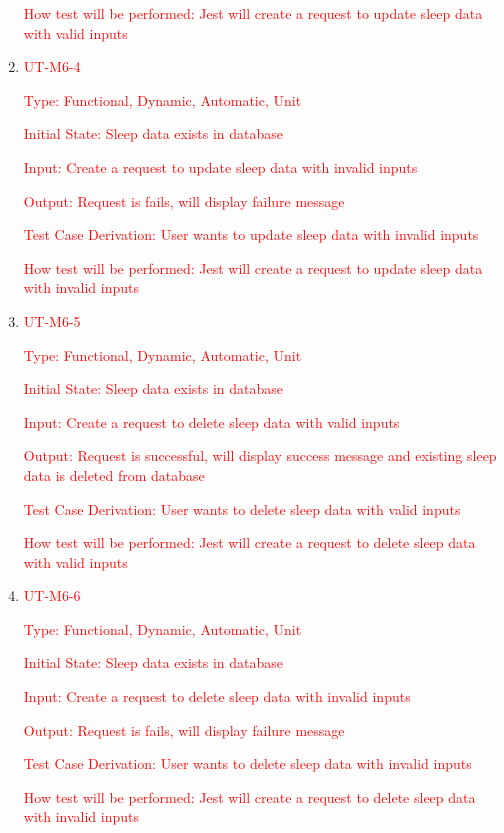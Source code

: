 \documentclass[12pt, titlepage]{article}
\begin{document}
\begin{enumerate}
	\textcolor{red}{How test will be performed: Jest will create a request to update sleep data with valid inputs}

        \item{\textcolor{red}{UT-M6-4\\}}

	\textcolor{red}{Type: Functional, Dynamic, Automatic, Unit}

	\textcolor{red}{Initial State: Sleep data exists in database}

	\textcolor{red}{Input: Create a request to update sleep data with invalid inputs}

	\textcolor{red}{Output: Request is fails, will display failure message}

	\textcolor{red}{Test Case Derivation: User wants to update sleep data with invalid inputs}

	\textcolor{red}{How test will be performed: Jest will create a request to update sleep data with invalid inputs}

    \item{\textcolor{red}{UT-M6-5\\}}

	\textcolor{red}{Type: Functional, Dynamic, Automatic, Unit}

	\textcolor{red}{Initial State: Sleep data exists in database}

	\textcolor{red}{Input: Create a request to delete sleep data with valid inputs}

	\textcolor{red}{Output: Request is successful, will display success message and existing sleep data is deleted from database}

	\textcolor{red}{Test Case Derivation: User wants to delete sleep data with valid inputs}

 \textcolor{red}{How test will be performed: Jest will create a request to delete sleep data with valid inputs}

         \item{\textcolor{red}{UT-M6-6\\}}

	\textcolor{red}{Type: Functional, Dynamic, Automatic, Unit}

	\textcolor{red}{Initial State: Sleep data exists in database}

	\textcolor{red}{Input: Create a request to delete sleep data with invalid inputs}

	\textcolor{red}{Output: Request is fails, will display failure message}

	\textcolor{red}{Test Case Derivation: User wants to delete sleep data with invalid inputs}

	\textcolor{red}{How test will be performed: Jest will create a request to delete sleep data with invalid inputs}

\end{enumerate}
\end{document}

